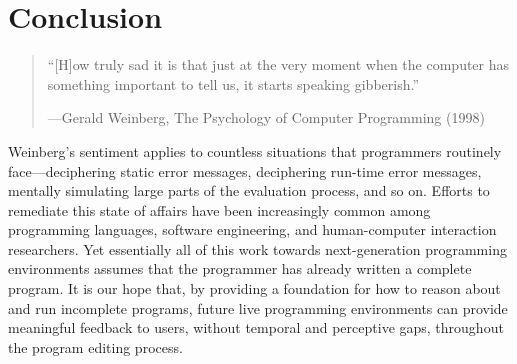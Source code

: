 \newcommand{\discussionSection}{Conclusion}
\section{\protect\discussionSection} %
\label{sec:discussion}

\begin{comment}
To conclude, we quote Weinberg from The Psychology of Computer Programming (1998): ``how truly sad it is that just at the very moment
when the computer has something important to tell us, it starts
speaking gibberish.''
\end{comment}

\begin{quote}
``[H]ow truly sad it is that just at the very moment
when the computer has something important to tell us, it starts
speaking gibberish.''

\vspace{3pt}

\hfill{}---Gerald Weinberg, The Psychology of Computer Programming (1998)
\end{quote}

\vspace{3pt}

\noindent
%
Weinberg's sentiment applies to countless situations that programmers routinely face---deciphering static error messages, deciphering run-time error messages, mentally simulating large parts of the evaluation process, and so on.
%
Efforts to remediate this state of affairs have been increasingly common among programming languages, software engineering, and human-computer interaction researchers.
%
Yet essentially all of this work towards next-generation programming environments assumes that the programmer has already written a complete program.
%
It is our hope that, by providing a foundation for how to reason about and run incomplete programs, future live programming environments can provide meaningful feedback to users, without temporal and perceptive gaps, throughout the program editing process.


